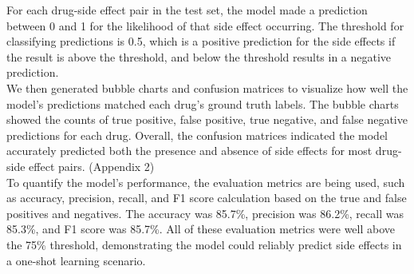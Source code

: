 \documentclass[conference]{IEEEtran}
\begin{document}
For each drug-side effect pair in the test set, the model made a prediction between 0 and 1 for the likelihood of that side effect occurring. The threshold for classifying predictions is 0.5, which is a positive prediction for the side effects if the result is above the threshold, and below the threshold results in a negative prediction.\\

We then generated bubble charts and confusion matrices to visualize how well the model's predictions matched each drug's ground truth labels. The bubble charts showed the counts of true positive, false positive, true negative, and false negative predictions for each drug. Overall, the confusion matrices indicated the model accurately predicted both the presence and absence of side effects for most drug-side effect pairs. (Appendix 2)\\

To quantify the model's performance, the evaluation metrics are being used, such as accuracy, precision, recall, and F1 score calculation based on the true and false positives and negatives. The accuracy was 85.7\%, precision was 86.2\%, recall was 85.3\%, and F1 score was 85.7\%. All of these evaluation metrics were well above the 75\% threshold, demonstrating the model could reliably predict side effects in a one-shot learning scenario.
\end{document}
